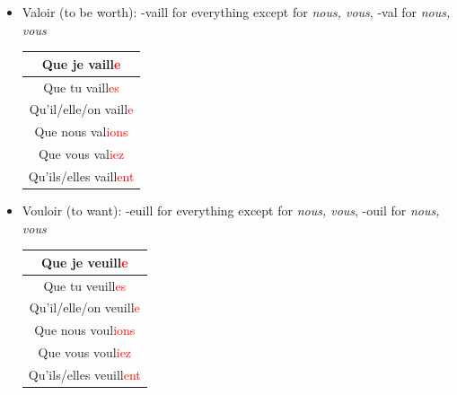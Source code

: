 \documentclass{book}
\begin{document}
\begin{enumerate}
\begin{itemize}
                    \item Valoir (to be worth): -vaill for everything except for \textit{nous, vous}, -val for \textit{nous, vous}
                        \begin{center}
                            \begin{tabular}{|c|}
                                \hline
                                Que je vaill\textcolor{red}{e} \\
                                \hline
                                Que tu vaill\textcolor{red}{es} \\
                                \hline
                                Qu'il/elle/on vaill\textcolor{red}{e} \\
                                \hline
                                Que nous val\textcolor{red}{ions} \\
                                \hline
                                Que vous val\textcolor{red}{iez} \\
                                \hline
                                Qu'ils/elles vaill\textcolor{red}{ent} \\
                                \hline
                            \end{tabular}
                        \end{center}

                    \item Vouloir (to want): -euill for everything except for \textit{nous, vous}, -ouil for \textit{nous, vous}
                        \begin{center}
                            \begin{tabular}{|c|}
                                \hline
                                Que je veuill\textcolor{red}{e} \\
                                \hline
                                Que tu veuill\textcolor{red}{es} \\
                                \hline
                                Qu'il/elle/on veuill\textcolor{red}{e} \\
                                \hline
                                Que nous voul\textcolor{red}{ions} \\
                                \hline
                                Que vous voul\textcolor{red}{iez} \\
                                \hline
                                Qu'ils/elles veuill\textcolor{red}{ent} \\
                                \hline
                            \end{tabular}
                        \end{center}


\end{itemize}
\end{enumerate}
\end{document}
